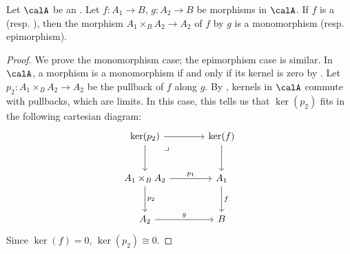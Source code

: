 \begin{lemma} \label{lemma:monomorphisms_epimorphisin_abelian_categories_are_preserved_by_pullbacks}
    Let $\calA$ be an . Let $f: A_1 \to B$, $g: A_2 \to B$ be morphisms in $\calA$.     
    If $f$ is a  (resp. ), then the  morphism $A_1 \times_B A_2 \to A_2$ of $f$ by $g$ is a monomorphism (resp. epimorphism).
\end{lemma}
\begin{proof}
    We prove the monomorphism case; the epimorphism case is similar. 
    In $\calA$, a morphism is a monomorphism if and only if its kernel is zero by . Let $p_2: A_1 \times_B A_2 \to A_2$ be the pullback of $f$ along $g$. 
    By , kernels in $\calA$ commute with pullbacks, which are limits. In this case, this tells us that $\ker(p_2)$ fits in the following cartesian diagram:
    \[
    \begin{tikzcd}[row sep=large, column sep=large]
        \ker(p_2) \arrow[r] \arrow[d] \arrow[dr, phantom, "\lrcorner", very near start] & \ker(f) \arrow[d] \\
        A_1 \times_B A_2 \arrow[r, "p_1"] \arrow[d, "p_2"] & A_1 \arrow[d, "f"] \\
        A_2 \arrow[r, "g"] & B
    \end{tikzcd}
    \]
    Since $\ker(f) = 0$, $\ker(p_2) \cong 0$.

\end{proof}
